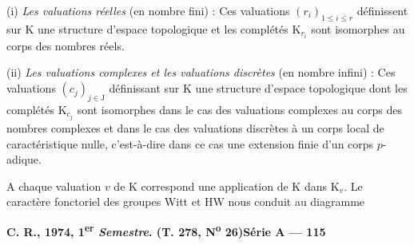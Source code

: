 (i) \emph{Les valuations réelles} (en nombre fini) : Ces valuations $(r_i)_{1\le i\le r}$ définissent sur K
une structure d'espace topologique et les complétés $\mathrm K_{r_i}$ sont isomorphes au corps des
nombres réels.

(ii) \emph{Les valuations complexes et les valuations discrètes} (en nombre infini) : Ces
valuations $(c_j)_{j\in\mathrm J}$ définissant sur K une structure d'espace topologique dont les complétés $\mathrm K_{c_j}$
sont isomorphes dans le cas des valuations complexes au corps des nombres complexes
et dans le cas des valuations discrètes à un corps local de caractéristique nulle, c'est-à-dire
dans ce cas une extension finie d'un corps $p$-adique.

A chaque valuation $v$ de K correspond une application de K dans $\mathrm K_v$. Le caractère
fonctoriel des groupes Witt et HW nous conduit au diagramme


\textbf{C. R., 1974, 1\textsuperscript{er} \emph{Semestre}. (T. 278, N\textsuperscript{o} 26)}\hfill\textbf{Série A — 115}

